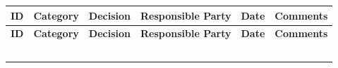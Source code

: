 \documentclass[10pt,letterpaper]{article}
\renewcommand\arraystretch{1.25}
\begin{document}
\begin{center}
\begingroup
\setlength\tabcolsep{2.0pt}
\scriptsize
\renewcommand\arraystretch{1.55}
\begin{longtable}{|>{\raggedright\arraybackslash}p{0.995in}|>{\raggedright\arraybackslash}p{0.995in}|>{\raggedright\arraybackslash}p{0.995in}|>{\raggedright\arraybackslash}p{0.995in}|>{\raggedright\arraybackslash}p{0.995in}|>{\raggedright\arraybackslash}p{0.995in}|}
\hline
\rowcolor{light}
\textbf{ID} & \textbf{Category} & \textbf{Decision} & \textbf{Responsible Party} & \textbf{Date} & \textbf{Comments} \\ \hline
\endfirsthead
\hline\rowcolor{light} \textbf{ID} & \textbf{Category} & \textbf{Decision} & \textbf{Responsible Party} & \textbf{Date} & \textbf{Comments} \\ \hline
\endhead
\rule{0pt}{11pt}\hspace{0pt} & \rule{0pt}{11pt}\hspace{0pt} & \rule{0pt}{11pt}\hspace{0pt} & \rule{0pt}{11pt}\hspace{0pt} & \rule{0pt}{11pt}\hspace{0pt} & \rule{0pt}{11pt}\hspace{0pt} \\ \hline
\rule{0pt}{11pt}\hspace{0pt} & \rule{0pt}{11pt}\hspace{0pt} & \rule{0pt}{11pt}\hspace{0pt} & \rule{0pt}{11pt}\hspace{0pt} & \rule{0pt}{11pt}\hspace{0pt} & \rule{0pt}{11pt}\hspace{0pt} \\ \hline
\rule{0pt}{11pt}\hspace{0pt} & \rule{0pt}{11pt}\hspace{0pt} & \rule{0pt}{11pt}\hspace{0pt} & \rule{0pt}{11pt}\hspace{0pt} & \rule{0pt}{11pt}\hspace{0pt} & \rule{0pt}{11pt}\hspace{0pt} \\ \hline
\rule{0pt}{11pt}\hspace{0pt} & \rule{0pt}{11pt}\hspace{0pt} & \rule{0pt}{11pt}\hspace{0pt} & \rule{0pt}{11pt}\hspace{0pt} & \rule{0pt}{11pt}\hspace{0pt} & \rule{0pt}{11pt}\hspace{0pt} \\ \hline
\rule{0pt}{11pt}\hspace{0pt} & \rule{0pt}{11pt}\hspace{0pt} & \rule{0pt}{11pt}\hspace{0pt} & \rule{0pt}{11pt}\hspace{0pt} & \rule{0pt}{11pt}\hspace{0pt} & \rule{0pt}{11pt}\hspace{0pt} \\ \hline
\end{longtable}
\endgroup
\end{center}
\end{document}
